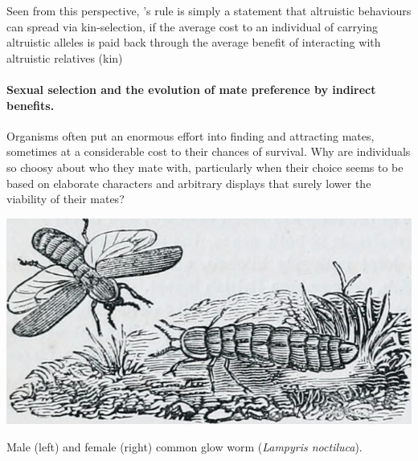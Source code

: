 Seen from this perspective, \citeauthor{hamilton1964genetical}'s rule
is simply a statement that altruistic behaviours can spread via
kin-selection, if the average cost to an individual of carrying altruistic alleles is paid back through the average benefit of interacting with altruistic relatives (kin)





\paragraph{Sexual selection and the evolution of mate preference by indirect benefits. }


Organisms often put an enormous effort into finding and attracting mates, sometimes at
a considerable cost to their chances of survival. Why are individuals so choosy about who they mate with, particularly when their choice seems to be based on elaborate characters and arbitrary displays
that surely lower the viability of their mates?  

\begin{marginfigure}
\begin{center}
\includegraphics[width= \textwidth]{illustration_images/Quant_gen/glow_worm/18011950889_b2a1a1323e_z.jpg}
\end{center}
\caption{Male (left) and female (right) common glow worm  ({\it Lampyris
    noctiluca}).  } \label{fig:glow_worms}
\end{marginfigure}

